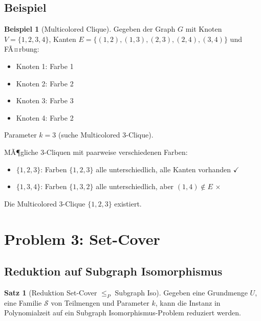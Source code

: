 ﻿\documentclass[a4paper,12pt]{article}
\theoremstyle{definition}
\newtheorem{beispiel}{Beispiel}[section]
\newtheorem{satz}{Satz}[section]
\begin{document}
\subsection{Beispiel}

\begin{beispiel}[Multicolored Clique]
	Gegeben der Graph $G$ mit Knoten $V = \{1, 2, 3, 4\}$, Kanten $E = \{(1,2), (1,3), (2,3), (2,4), (3,4)\}$ und FÃ¤rbung:
	\begin{itemize}
		\item Knoten 1: Farbe 1
		\item Knoten 2: Farbe 2
		\item Knoten 3: Farbe 3
		\item Knoten 4: Farbe 2
	\end{itemize}
	
	Parameter $k = 3$ (suche Multicolored 3-Clique).
	
	MÃ¶gliche 3-Cliquen mit paarweise verschiedenen Farben:
	\begin{itemize}
		\item $\{1, 2, 3\}$: Farben $\{1, 2, 3\}$ alle unterschiedlich, alle Kanten vorhanden $\checkmark$
		\item $\{1, 3, 4\}$: Farben $\{1, 3, 2\}$ alle unterschiedlich, aber $(1, 4) \notin E$ $\times$
	\end{itemize}
	
	Die Multicolored 3-Clique $\{1, 2, 3\}$ existiert.
\end{beispiel}

\section{Problem 3: Set-Cover}

\subsection{Reduktion auf Subgraph Isomorphismus}

\begin{satz}[Reduktion Set-Cover $\leq_P$ Subgraph Iso]
	Gegeben eine Grundmenge $U$, eine Familie $\mathcal{S}$ von Teilmengen und Parameter $k$, kann die Instanz in Polynomialzeit auf ein Subgraph Isomorphismus-Problem reduziert werden.
\end{satz}
\end{document}
